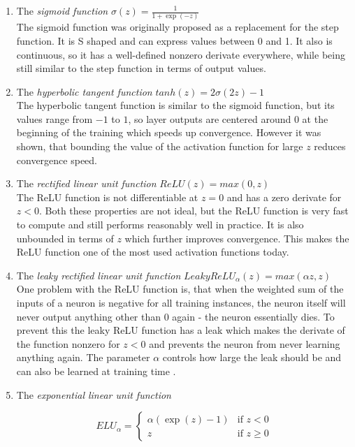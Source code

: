 \begin{enumerate}
  \item The \textit{sigmoid function} $\sigma(z) = \frac{1}{1 + \exp(-z)}$ \\
    The sigmoid function was originally proposed as a replacement for the step function. It is S shaped and can express values between 0 and 1. It also is continuous, so it has a well-defined nonzero derivate everywhere, while being still similar to the step function in terms of output values.
  \item The \textit{hyperbolic tangent function} $tanh(z) = 2\sigma(2z) - 1$ \\
    The hyperbolic tangent function is similar to the sigmoid function, but its values range from $-1$ to $1$, so layer outputs are centered around 0 at the beginning of the training which speeds up convergence. However it was shown, that bounding the value of the activation function for large $z$ reduces convergence speed.
  \item The \textit{rectified linear unit function} $ReLU(z) = max(0, z)$ \\
    The ReLU function is not differentiable at $z=0$ and has a zero derivate for $z < 0$. Both these properties are not ideal, but the ReLU function is very fast to compute and still performs reasonably well in practice. It is also unbounded in terms of $z$ which further improves convergence. This makes the ReLU function one of the most used activation functions today.
  \item The \textit{leaky rectified linear unit function} $LeakyReLU_\alpha(z) = max(\alpha z, z)$ \\
    One problem with the ReLU function is, that when the weighted sum of the inputs of a neuron is negative for all training instances, the neuron itself will never output anything other than 0 again - the neuron essentially dies. To prevent this the leaky ReLU function has a leak which makes the derivate of the function nonzero for $z < 0$ and prevents the neuron from never learning anything again. The parameter $\alpha$ controls how large the leak should be and can also be learned at training time \cite{xu2015empirical}.
  \item The \textit{exponential linear unit function}
  
  \[ELU_\alpha = 
  \begin{cases} 
    \alpha(\exp(z) - 1) & \text{if } z < 0 \\
    z  & \text{if } z \geq 0
  \end{cases} \]


\end{enumerate}
